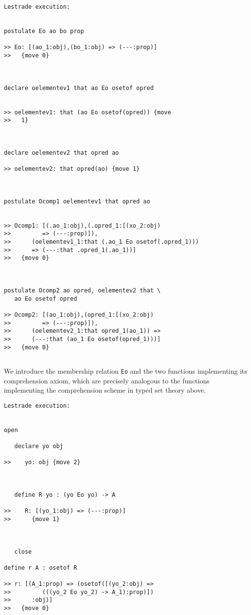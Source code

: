 \documentclass[12pt]{article}
\begin{document}
\begin{verbatim}Lestrade execution:


postulate Eo ao bo prop

>> Eo: [(ao_1:obj),(bo_1:obj) => (---:prop)]
>>   {move 0}



declare oelementev1 that ao Eo osetof opred


>> oelementev1: that (ao Eo osetof(opred)) {move
>>   1}



declare oelementev2 that opred ao

>> oelementev2: that opred(ao) {move 1}



postulate Ocomp1 oelementev1 that opred ao


>> Ocomp1: [(.ao_1:obj),(.opred_1:[(xo_2:obj)
>>         => (---:prop)]),
>>      (oelementev1_1:that (.ao_1 Eo osetof(.opred_1)))
>>      => (---:that .opred_1(.ao_1))]
>>   {move 0}



postulate Ocomp2 ao opred, oelementev2 that \
   ao Eo osetof opred

>> Ocomp2: [(ao_1:obj),(opred_1:[(xo_2:obj)
>>         => (---:prop)]),
>>      (oelementev2_1:that opred_1(ao_1)) =>
>>      (---:that (ao_1 Eo osetof(opred_1)))]
>>   {move 0}


\end{verbatim}

We introduce the membership relation {\tt Eo} and the two functions implementing its comprehension axiom, which are precisely analogous to the functions implementing the comprehension scheme in typed set theory above.

\begin{verbatim}Lestrade execution:


open

   declare yo obj

>>    yo: obj {move 2}



   define R yo : (yo Eo yo) -> A

>>    R: [(yo_1:obj) => (---:prop)]
>>      {move 1}



   close

define r A : osetof R

>> r: [(A_1:prop) => (osetof([(yo_2:obj) =>
>>         (((yo_2 Eo yo_2) -> A_1):prop)])
>>      :obj)]
>>   {move 0}


\end{verbatim}
\end{document}
